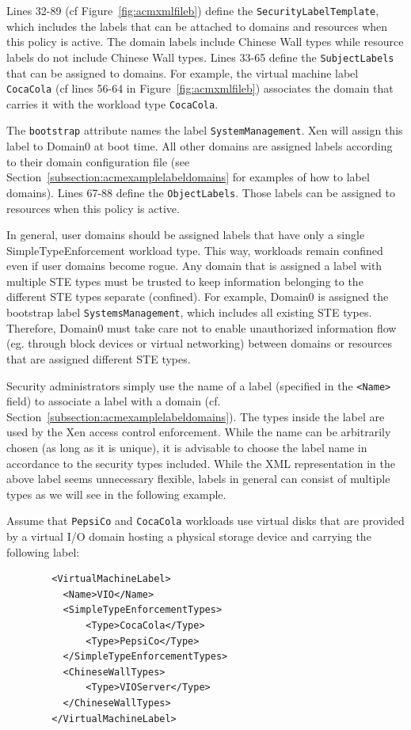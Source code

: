\documentclass[11pt,twoside,final,openright]{report}
\begin{document}
Lines 32-89 (cf Figure~\ref{fig:acmxmlfileb}) define the
\verb|SecurityLabelTemplate|, which includes the labels that can be
attached to domains and resources when this policy is active. The
domain labels include Chinese Wall types while resource labels do not
include Chinese Wall types. Lines 33-65 define the
\verb|SubjectLabels| that can be assigned to domains. For example, the
virtual machine label \verb|CocaCola| (cf lines 56-64 in
Figure~\ref{fig:acmxmlfileb}) associates the domain that carries it
with the workload type \verb|CocaCola|.

The \verb|bootstrap| attribute names the label
\verb|SystemManagement|.  Xen will assign this label to Domain0 at
boot time. All other domains are assigned labels according to their
domain configuration file (see
Section~\ref{subsection:acmexamplelabeldomains} for examples of how to
label domains). Lines 67-88 define the \verb|ObjectLabels|. Those
labels can be assigned to resources when this policy is active.

In general, user domains should be assigned labels that have only a
single SimpleTypeEnforcement workload type. This way, workloads remain
confined even if user domains become rogue. Any domain that is
assigned a label with multiple STE types must be trusted to keep
information belonging to the different STE types separate (confined).
For example, Domain0 is assigned the bootstrap label
\verb|SystemsManagement|, which includes all existing STE types.
Therefore, Domain0 must take care not to enable unauthorized
information flow (eg. through block devices or virtual networking)
between domains or resources that are assigned different STE types.

Security administrators simply use the name of a label (specified in
the \verb|<Name>| field) to associate a label with a domain (cf.
Section~\ref{subsection:acmexamplelabeldomains}). The types inside the
label are used by the Xen access control enforcement.  While the name
can be arbitrarily chosen (as long as it is unique), it is advisable
to choose the label name in accordance to the security types included.
While the XML representation in the above label seems unnecessary
flexible, labels in general can consist of multiple types as we will
see in the following example.

Assume that \verb|PepsiCo| and \verb|CocaCola| workloads use virtual
disks that are provided by a virtual I/O domain hosting a physical
storage device and carrying the following label:

\begin{scriptsize}
\begin{verbatim}
        <VirtualMachineLabel>
          <Name>VIO</Name>
          <SimpleTypeEnforcementTypes>
              <Type>CocaCola</Type>
              <Type>PepsiCo</Type>
          </SimpleTypeEnforcementTypes>
          <ChineseWallTypes>
              <Type>VIOServer</Type>
          </ChineseWallTypes>
        </VirtualMachineLabel>
\end{verbatim}
\end{scriptsize}
\end{document}

